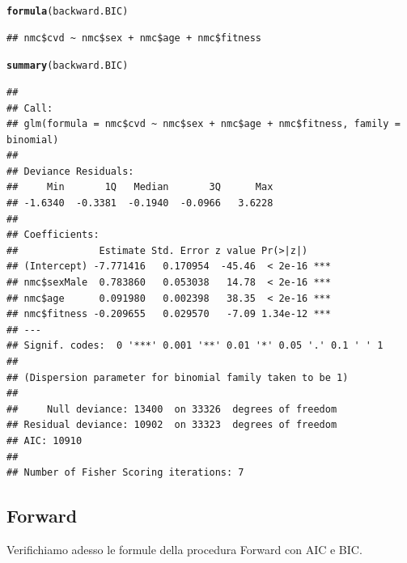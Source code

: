 \documentclass{article}\usepackage[]{graphicx}\usepackage[]{xcolor}
\makeatletter
\newcommand{\hlstd}[1]{\textcolor[rgb]{0.345,0.345,0.345}{#1}}%
\newcommand{\hlkwd}[1]{\textcolor[rgb]{0.737,0.353,0.396}{\textbf{#1}}}%
\newenvironment{kframe}{%
 \def\at@end@of@kframe{}%
 \ifinner\ifhmode%
  \def\at@end@of@kframe{\end{minipage}}%
  \begin{minipage}{\columnwidth}%
 \fi\fi%
 \def\FrameCommand##1{\hskip\@totalleftmargin \hskip-\fboxsep
 \colorbox{shadecolor}{##1}\hskip-\fboxsep
     \hskip-\linewidth \hskip-\@totalleftmargin \hskip\columnwidth}%
 \MakeFramed {\advance\hsize-\width
   \@totalleftmargin\z@ \linewidth\hsize
   \@setminipage}}%
 {\par\unskip\endMakeFramed%
 \at@end@of@kframe}
\newenvironment{knitrout}{}{} %
\makeatother
\begin{document}
\begin{knitrout}
\begin{kframe}
\begin{alltt}
\hlkwd{formula}\hlstd{(backward.BIC)}
\end{alltt}
\begin{verbatim}
## nmc$cvd ~ nmc$sex + nmc$age + nmc$fitness
\end{verbatim}
\begin{alltt}
\hlkwd{summary}\hlstd{(backward.BIC)}
\end{alltt}
\begin{verbatim}
## 
## Call:
## glm(formula = nmc$cvd ~ nmc$sex + nmc$age + nmc$fitness, family = binomial)
## 
## Deviance Residuals: 
##     Min       1Q   Median       3Q      Max  
## -1.6340  -0.3381  -0.1940  -0.0966   3.6228  
## 
## Coefficients:
##              Estimate Std. Error z value Pr(>|z|)    
## (Intercept) -7.771416   0.170954  -45.46  < 2e-16 ***
## nmc$sexMale  0.783860   0.053038   14.78  < 2e-16 ***
## nmc$age      0.091980   0.002398   38.35  < 2e-16 ***
## nmc$fitness -0.209655   0.029570   -7.09 1.34e-12 ***
## ---
## Signif. codes:  0 '***' 0.001 '**' 0.01 '*' 0.05 '.' 0.1 ' ' 1
## 
## (Dispersion parameter for binomial family taken to be 1)
## 
##     Null deviance: 13400  on 33326  degrees of freedom
## Residual deviance: 10902  on 33323  degrees of freedom
## AIC: 10910
## 
## Number of Fisher Scoring iterations: 7
\end{verbatim}
\end{kframe}
\end{knitrout}
          
    \subsection{Forward} 
      Verifichiamo adesso le formule della procedura Forward con AIC e BIC.
\end{document}
